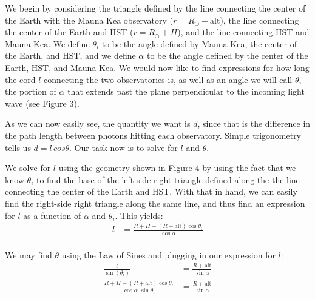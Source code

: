\documentclass[12pt]{article}
\begin{document}
\begin{onehalfspacing}
We begin by considering the triangle defined by the line connecting the center of the Earth with the Mauna Kea observatory ($r = R_{\oplus} + \text{alt}$), the line connecting the center of the Earth and HST ($r = R_{\oplus} + H$), and the line connecting HST and Mauna Kea. We define $\theta_i$ to be the angle defined by Mauna Kea, the center of the Earth, and HST, and we define $\alpha$ to be the angle defined by the center of the Earth, HST, and Mauna Kea. We would now like to find expressions for how long the cord $l$ connecting the two observatories is, as well as an angle we will call $\theta$, the portion of $\alpha$ that extends past the plane perpendicular to the incoming light wave (see Figure 3). \bigskip


As we can now easily see, the quantity we want is $d$, since that is the difference in the path length between photons hitting each observatory. Simple trigonometry tells us $d = l \, cos{\theta}$. Our task now is to solve for $l$ and $\theta$.

\bigskip
\bigskip


\begin{figure}

\end{figure}

We solve for $l$ using the geometry shown in Figure 4 by using the fact that we know $\theta_i$ to find the base of the left-side right triangle defined along the the line connecting the center of the Earth and HST. With that in hand, we can easily find the right-side right triangle along the same line, and thus find an expression for $l$ as a function of $\alpha$ and $\theta_i$. This yields:
\begin{align*}
  l &= \frac{R + H - (R + \text{alt}) \cos \theta_i}{\cos \alpha} \\
\end{align*}

We may find $\theta$ using the Law of Sines and plugging in our expression for $l$:
\begin{align*}
  \frac{l}{\sin(\theta_i)} &= \frac{R + \text{alt}}{\sin \alpha} \\
  \frac{R + H - (R + \text{alt}) \cos{\theta_i}}{\cos \alpha \,\, \sin \theta_i} &= \frac{R + \text{alt}}{\sin \alpha} \\
\end{align*}


\end{onehalfspacing}
\end{document}
